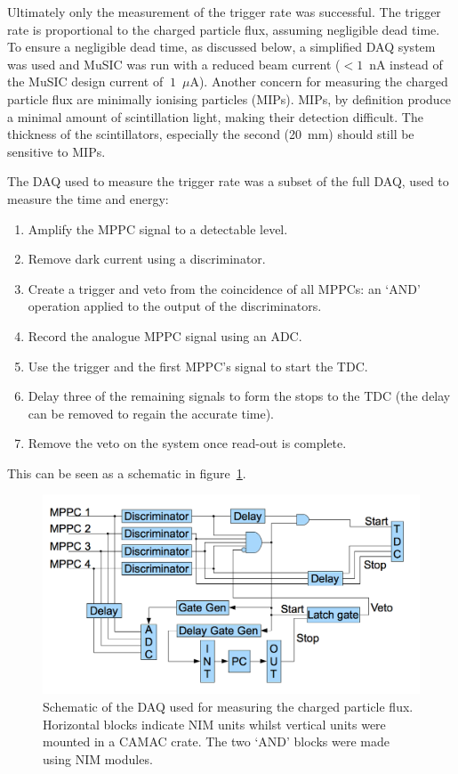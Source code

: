 Ultimately only the measurement of the trigger rate was successful. The trigger rate is proportional to the charged particle flux,  assuming negligible dead time. To ensure a negligible dead time, as discussed below, a simplified DAQ system was used and MuSIC was run with a reduced beam current (\(<1\)~nA instead of the MuSIC design current of \(~1\)~\(\mu\)A). Another concern for measuring the charged particle flux are minimally ionising particles (MIPs). MIPs, by definition produce a minimal amount of scintillation light, making their detection difficult. The thickness of the scintillators, especially the second (20~mm) should still be sensitive to MIPs.


The DAQ used to measure the trigger rate was a subset of the full DAQ, used to measure the time and energy:
\begin{enumerate}
  \item Amplify the MPPC signal to a detectable level.
  \item Remove dark current using a discriminator.
  \item Create a trigger and veto from the coincidence of all MPPCs: an `AND' operation applied to the output of the discriminators.
  \item Record the analogue MPPC signal using an ADC.
  \item Use the trigger and the first MPPC's signal to start the TDC.
  \item Delay three of the remaining signals to form the stops to the TDC (the delay can be removed to regain the accurate time).
  \item Remove the veto on the system once read-out is complete.
\end{enumerate}
This can be seen as a schematic in figure~\ref{fig:MuSIC1_DAQ_Block}. 

\begin{figure}[hptb]
  \centering
  \includegraphics[width=.9\textwidth]{images/charged_flux/MuSIC1_DAQ_Block.png}
  \caption{Schematic of the DAQ used for measuring the charged particle flux. Horizontal blocks indicate NIM units whilst vertical units were mounted in a CAMAC crate. The two `AND' blocks were made using NIM modules.}
  \label{fig:MuSIC1_DAQ_Block}
\end{figure}

